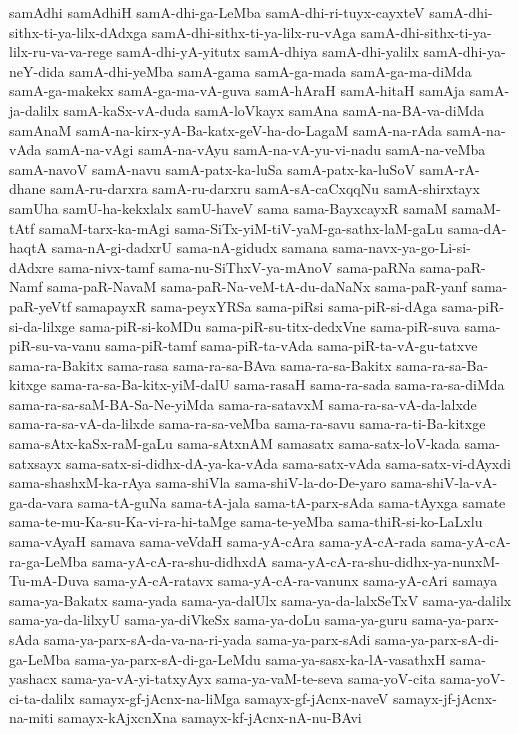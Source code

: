 {samAdhi
samAdhiH
samA-dhi-ga-LeMba
samA-dhi-ri-tuyx-cayxteV
samA-dhi-sithx-ti-ya-lilx-dAdxga
samA-dhi-sithx-ti-ya-lilx-ru-vAga
samA-dhi-sithx-ti-ya-lilx-ru-va-va-rege
samA-dhi-yA-yitutx
samA-dhiya
samA-dhi-yalilx
samA-dhi-ya-neY-dida
samA-dhi-yeMba
samA-gama
samA-ga-mada
samA-ga-ma-diMda
samA-ga-makekx
samA-ga-ma-vA-guva
samA-hAraH
samA-hitaH
samAja
samA-ja-dalilx
samA-kaSx-vA-duda
samA-loVkayx
samAna
samA-na-BA-va-diMda
samAnaM
samA-na-kirx-yA-Ba-katx-geV-ha-do-LagaM
samA-na-rAda
samA-na-vAda
samA-na-vAgi
samA-na-vAyu
samA-na-vA-yu-vi-nadu
samA-na-veMba
samA-navoV
samA-navu
samA-patx-ka-luSa
samA-patx-ka-luSoV
samA-rA-dhane
samA-ru-darxra
samA-ru-darxru
samA-sA-caCxqqNu
samA-shirxtayx
samUha
samU-ha-kekxlalx
samU-haveV
sama
sama-BayxcayxR
samaM
samaM-tAtf
samaM-tarx-ka-mAgi
sama-SiTx-yiM-tiV-yaM-ga-sathx-laM-gaLu
sama-dA-haqtA
sama-nA-gi-dadxrU
sama-nA-gidudx
samana
sama-navx-ya-go-Li-si-dAdxre
sama-nivx-tamf
sama-nu-SiThxV-ya-mAnoV
sama-paRNa
sama-paR-Namf
sama-paR-NavaM
sama-paR-Na-veM-tA-du-daNaNx
sama-paR-yanf
sama-paR-yeVtf
samapayxR
sama-peyxYRSa
sama-piRsi
sama-piR-si-dAga
sama-piR-si-da-lilxge
sama-piR-si-koMDu
sama-piR-su-titx-dedxVne
sama-piR-suva
sama-piR-su-va-vanu
sama-piR-tamf
sama-piR-ta-vAda
sama-piR-ta-vA-gu-tatxve
sama-ra-Bakitx
sama-rasa
sama-ra-sa-BAva
sama-ra-sa-Bakitx
sama-ra-sa-Ba-kitxge
sama-ra-sa-Ba-kitx-yiM-dalU
sama-rasaH
sama-ra-sada
sama-ra-sa-diMda
sama-ra-sa-saM-BA-Sa-Ne-yiMda
sama-ra-satavxM
sama-ra-sa-vA-da-lalxde
sama-ra-sa-vA-da-lilxde
sama-ra-sa-veMba
sama-ra-savu
sama-ra-ti-Ba-kitxge
sama-sAtx-kaSx-raM-gaLu
sama-sAtxnAM
samasatx
sama-satx-loV-kada
sama-satxsayx
sama-satx-si-didhx-dA-ya-ka-vAda
sama-satx-vAda
sama-satx-vi-dAyxdi
sama-shashxM-ka-rAya
sama-shiVla
sama-shiV-la-do-De-yaro
sama-shiV-la-vA-ga-da-vara
sama-tA-guNa
sama-tA-jala
sama-tA-parx-sAda
sama-tAyxga
samate
sama-te-mu-Ka-su-Ka-vi-ra-hi-taMge
sama-te-yeMba
sama-thiR-si-ko-LaLxlu
sama-vAyaH
samava
sama-veVdaH
sama-yA-cAra
sama-yA-cA-rada
sama-yA-cA-ra-ga-LeMba
sama-yA-cA-ra-shu-didhxdA
sama-yA-cA-ra-shu-didhx-ya-nunxM-Tu-mA-Duva
sama-yA-cA-ratavx
sama-yA-cA-ra-vanunx
sama-yA-cAri
samaya
sama-ya-Bakatx
sama-yada
sama-ya-dalUlx
sama-ya-da-lalxSeTxV
sama-ya-dalilx
sama-ya-da-lilxyU
sama-ya-diVkeSx
sama-ya-doLu
sama-ya-guru
sama-ya-parx-sAda
sama-ya-parx-sA-da-va-na-ri-yada
sama-ya-parx-sAdi
sama-ya-parx-sA-di-ga-LeMba
sama-ya-parx-sA-di-ga-LeMdu
sama-ya-sasx-ka-lA-vasathxH
sama-yashacx
sama-ya-vA-yi-tatxyAyx
sama-ya-vaM-te-seva
sama-yoV-cita
sama-yoV-ci-ta-dalilx
samayx-gf-jAcnx-na-liMga
samayx-gf-jAcnx-naveV
samayx-jf-jAcnx-na-miti
samayx-kAjxcnXna
samayx-kf-jAcnx-nA-nu-BAvi
}
